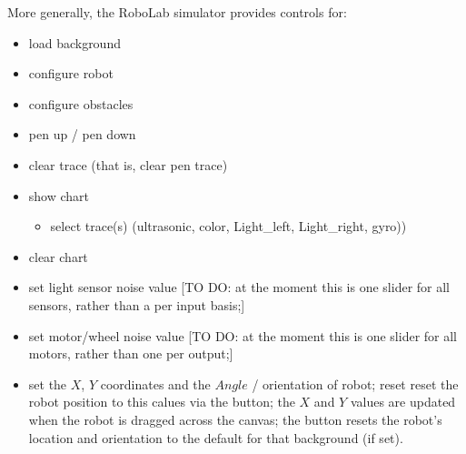 \documentclass[letterpaper,10pt,english]{sphinxmanual}
\begin{document}
More generally, the RoboLab simulator provides controls for:
\begin{itemize}
\item {} 
load background

\item {} 
configure robot

\item {} 
configure obstacles

\item {} 
pen up / pen down

\item {} 
clear trace (that is, clear pen trace)

\item {} 
show chart
\begin{itemize}
\item {} 
select trace(s) (ultrasonic, color, Light\_left, Light\_right, gyro))

\end{itemize}

\item {} 
clear chart

\item {} 
set light sensor noise value {[}TO DO: at the moment this is one slider for all sensors, rather than a per input basis;{]}

\item {} 
set motor/wheel noise value {[}TO DO: at the moment this is one slider for all motors, rather than one per output;{]}

\item {} 
set the \(X\), \(Y\) co\sphinxhyphen{}ordinates and the \(Angle\) / orientation of robot; reset reset the robot position to this calues via the  button; the \(X\) and \(Y\) values are updated when the robot is dragged across the canvas; the  button resets the robot’s location and orientation to the default for that background (if set).

\end{itemize}


\end{document}
